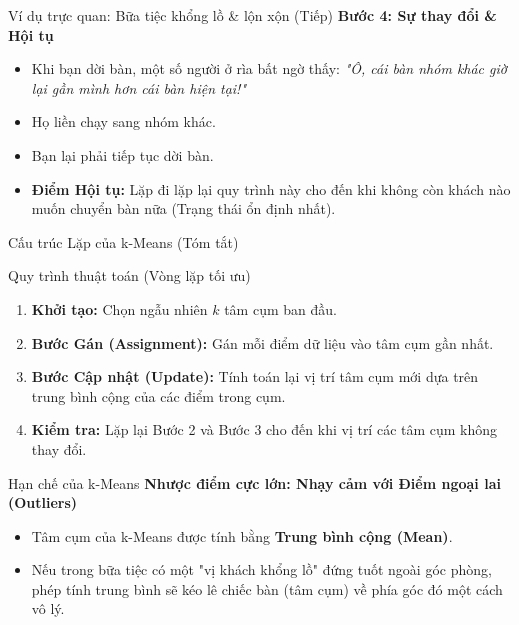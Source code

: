\documentclass[aspectratio=169]{beamer}
\begin{document}
\begin{frame}{Ví dụ trực quan: Bữa tiệc khổng lồ \& lộn xộn (Tiếp)}
    \textbf{Bước 4: Sự thay đổi \& Hội tụ}
    \begin{itemize}
        \item Khi bạn dời bàn, một số người ở rìa bất ngờ thấy: \textit{"Ô, cái bàn nhóm khác giờ lại gần mình hơn cái bàn hiện tại!"}
        \item Họ liền chạy sang nhóm khác.
        \item Bạn lại phải tiếp tục dời bàn.
        \item \textbf{Điểm Hội tụ:} Lặp đi lặp lại quy trình này cho đến khi không còn khách nào muốn chuyển bàn nữa (Trạng thái ổn định nhất).
    \end{itemize}
\end{frame}

\begin{frame}{Cấu trúc Lặp của k-Means (Tóm tắt)}
    \begin{block}{Quy trình thuật toán (Vòng lặp tối ưu)}
        \begin{enumerate}
            \item \textbf{Khởi tạo:} Chọn ngẫu nhiên $k$ tâm cụm ban đầu.
            \item \textbf{Bước Gán (Assignment):} Gán mỗi điểm dữ liệu vào tâm cụm gần nhất.
            \item \textbf{Bước Cập nhật (Update):} Tính toán lại vị trí tâm cụm mới dựa trên trung bình cộng của các điểm trong cụm.
            \item \textbf{Kiểm tra:} Lặp lại Bước 2 và Bước 3 cho đến khi vị trí các tâm cụm không thay đổi.
        \end{enumerate}
    \end{block}
\end{frame}

\begin{frame}{Hạn chế của k-Means}
    \textbf{Nhược điểm cực lớn: Nhạy cảm với Điểm ngoại lai (Outliers)}
    \begin{itemize}
        \item Tâm cụm của k-Means được tính bằng \textbf{Trung bình cộng (Mean)}.
        \item Nếu trong bữa tiệc có một "vị khách khổng lồ" đứng tuốt ngoài góc phòng, phép tính trung bình sẽ kéo lê chiếc bàn (tâm cụm) về phía góc đó một cách vô lý.
    \end{itemize}
\end{frame}
\end{document}
